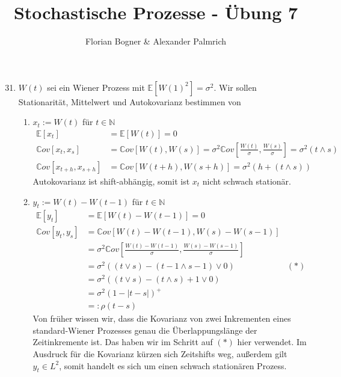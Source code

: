 \documentclass[a4paper,11pt,notitlepage,fullpage]{article}
\newcommand{\Ee}[1]{\mathbb E\left[#1\right]}
\newcommand{\Cov}[1]{\mathbb Cov\left[#1\right]}
\begin{document}
\author{Florian Bogner \& Alexander Palmrich}
\title{Stochastische Prozesse - Übung 7}
\maketitle

\begin{enumerate}
\setcounter{enumi}{30}


\item $W(t)$ sei ein Wiener Prozess mit $\Ee{W(1)^2}=\sigma^2$. Wir sollen Stationarität, Mittelwert und Autokovarianz bestimmen von
\begin{enumerate}
\item $x_t := W(t)$ für $t\in \mathbb{N}$
\begin{align*}
\Ee{x_t} &= \Ee{W(t)} = 0\\
\Cov{x_t, x_s} &= \Cov{W(t),W(s)} = \sigma^2\Cov{\frac{W(t)}{\sigma},\frac{W(s)}{\sigma}} = \sigma^2 (t\wedge s)\\
\Cov{x_{t+h}, x_{s+h}} &= \Cov{W(t+h),W(s+h)} = \sigma^2 \left(h + (t\wedge s) \right)
\end{align*}
Autokovarianz ist shift-abhängig, somit ist $x_t$ nicht schwach stationär.

\item $y_t := W(t)-W(t-1)$ für $t\in \mathbb{N}$
\begin{align*}
\Ee{y_t} &= \Ee{W(t)-W(t-1)} = 0\\
\Cov{y_t, y_s} &= \Cov{W(t)-W(t-1),W(s)-W(s-1)}\\
 &=\sigma^2\Cov{\frac{W(t)-W(t-1)}{\sigma},\frac{W(s)-W(s-1)}{\sigma}}\\
 &= \sigma^2 \left((t \lor s)-(t-1 \land s-1) \lor 0 \right) &(*)\\
 &= \sigma^2 \left((t \lor s)-(t \land s) +1 \lor 0 \right)\\
 &= \sigma^2 \left(1-|t-s| \right)^+\\
 &=: \rho(t-s)
\end{align*}
Von früher wissen wir, dass die Kovarianz von zwei Inkrementen eines standard-Wiener Prozesses genau die Überlappungslänge der Zeitinkremente ist. Das haben wir im Schritt auf $(*)$ hier verwendet. Im Ausdruck für die Kovarianz kürzen sich Zeitshifts weg, außerdem gilt $y_t \in L^2$, somit handelt es sich um einen schwach stationären Prozess.


\end{enumerate}
\end{enumerate}
\end{document}
